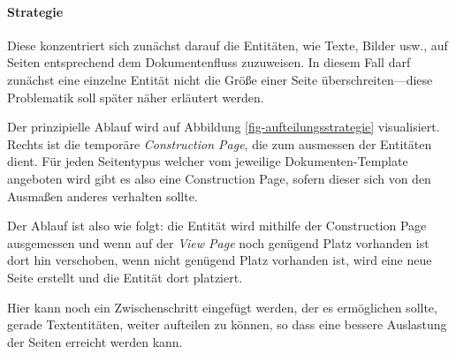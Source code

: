 \paragraph{Strategie}
Diese konzentriert sich zunächst darauf die Entitäten, wie Texte, Bilder usw.,
auf Seiten entsprechend dem Dokumentenfluss zuzuweisen.
In diesem Fall darf zunächst eine
einzelne Entität nicht die Größe einer Seite überschreiten---diese
Problematik soll später näher erläutert werden.

Der prinzipielle Ablauf wird auf Abbildung \ref{fig-aufteilungsstrategie}
visualisiert. Rechts ist die temporäre \emph{Construction Page}, die zum
ausmessen der Entitäten dient. Für jeden Seitentypus welcher vom jeweilige
Dokumenten-Template angeboten wird gibt es also eine Construction Page, sofern
dieser sich von den Ausmaßen anderes verhalten sollte.

Der Ablauf ist also wie folgt: die Entität wird mithilfe der Construction
Page ausgemessen und wenn auf der \emph{View Page} noch genügend Platz
vorhanden ist dort hin verschoben, wenn nicht genügend Platz vorhanden ist,
wird eine neue Seite erstellt und die Entität dort platziert.

Hier kann noch ein Zwischenschritt eingefügt werden, der es ermöglichen
sollte, gerade Textentitäten, weiter aufteilen zu können, so dass eine
bessere Auslastung der Seiten erreicht werden kann.

